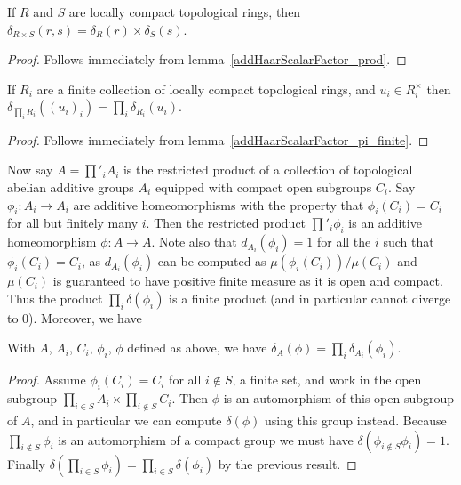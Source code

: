 \begin{lemma}
  \label{distribHaarChar_prod}
  If $R$ and $S$ are locally compact topological rings, then $\delta_{R\times S}(r,s)=\delta_R(r)\times\delta_S(s)$.
\end{lemma}
\begin{proof}
  Follows immediately from lemma~\ref{addHaarScalarFactor_prod}.
\end{proof}

\begin{lemma}
  \label{distribHaarChar_pi_finite}
  If $R_i$ are a finite collection of locally compact topological rings,
  and $u_i\in R_i^\times$ then $\delta_{\prod_i R_i}((u_i)_i)=\prod_i\delta_{R_i}(u_i)$.
\end{lemma}
\begin{proof}
  Follows immediately from lemma~\ref{addHaarScalarFactor_pi_finite}.
\end{proof}

Now say $A=\prod'_i A_i$ is the restricted product of a collection of topological abelian additive groups $A_i$
  equipped with compact open subgroups $C_i$. Say $\phi_i:A_i\to A_i$ are additive homeomorphisms
  with the property that $\phi_i(C_i)=C_i$ for all but finitely many $i$. Then the restricted
  product $\prod'_i\phi_i$ is an additive homeomorphism $\phi:A\to A$. Note also that
  $d_{A_i}(\phi_i)=1$ for all the $i$ such that $\phi_i(C_i)=C_i$, as $d_{A_i}(\phi_i)$ can be
  computed as $\mu(\phi_i(C_i))/\mu(C_i)$ and $\mu(C_i)$ is guaranteed to have positive finite measure
  as it is open and compact. Thus the product $\prod_i\delta(\phi_i)$ is a finite product (and in
  particular cannot diverge to $0$). Moreover, we have

\begin{lemma}
  \label{addHaarScalarFactor_restricted_product}
  With $A$, $A_i$, $C_i$, $\phi_i$, $\phi$ defined as above, we have
  $\delta_A(\phi)=\prod_i\delta_{A_i}(\phi_i)$.
\end{lemma}
\begin{proof}
  Assume $\phi_i(C_i)=C_i$ for all $i\not\in S$, a finite set, and work in the
  open subgroup $\prod_{i\in S}A_i\times\prod_{i\not\in S}C_i$. Then $\phi$ is an automorphism of
  this open subgroup of $A$, and in particular we can compute $\delta(\phi)$ using
  this group instead. Because $\prod_{i\not\in S}\phi_i$ is an automorphism of a compact
  group we must have $\delta(\phi_{i\not\in S}\phi_i)=1$. Finally
  $\delta(\prod_{i\in S}\phi_i)=\prod_{i\in S}\delta(\phi_i)$ by the previous result.
\end{proof}

